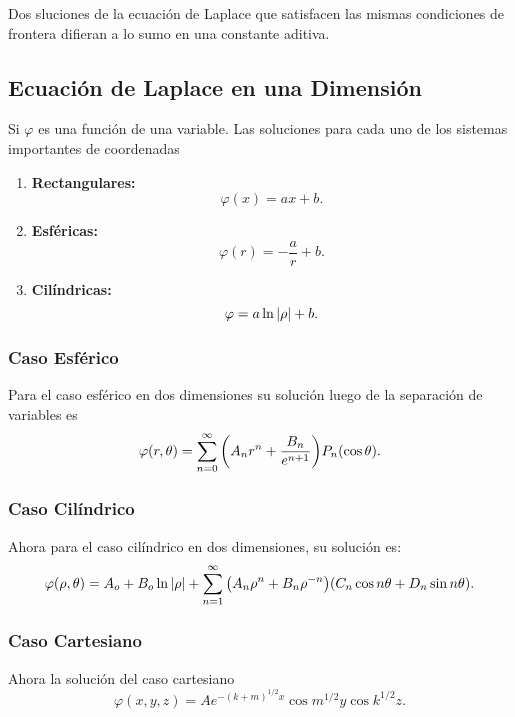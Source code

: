 \begin{teorema}
	Dos sluciones de la ecuación de Laplace que satisfacen las mismas condiciones de frontera difieran a lo sumo en una constante aditiva.
\end{teorema}


\subsection{Ecuación de Laplace en una Dimensión}
Si $\varphi$ es una función de una variable. Las soluciones para cada uno de los sistemas importantes de coordenadas

\begin{enumerate}
	\item \textbf{Rectangulares:}
	\begin{equation}
		\varphi (x) = ax + b.
	\end{equation}
	\item \textbf{Esféricas: }
	\begin{equation}
		\varphi (r) = -\frac{a}{r} + b.
	\end{equation}
	\item \textbf{Cilíndricas: }
	\begin{equation}
		\varphi = a\ln{\abs{\rho}} + b.
	\end{equation}
\end{enumerate}

\subsubsection{Caso Esférico}
Para el caso esférico en dos dimensiones su solución luego de la separación de variables es
\begin{equation}
	\varphi (r,\theta) = \sum _{n=0} ^\infty \qty(A_n r^n + \frac{B_n}{e^{n+1}}) P_n (\cos{\theta}).
\end{equation}

\subsubsection{Caso Cilíndrico}
Ahora para el caso cilíndrico en dos dimensiones, su solución es:
\begin{equation}
	\varphi (\rho ,\theta) = A_o + B_o \ln{\abs{\rho}} + \sum _{n=1} ^\infty \qty(A_n \rho ^n + B_n \rho ^{-n}) \qty(C_n \cos{n \theta} + D_n \sin{n\theta}).
\end{equation}

\subsubsection{Caso Cartesiano}
Ahora la solución del caso cartesiano
\begin{equation}
	\varphi (x,y,z) = A e^{-(k + m) ^{1/2} x} \cos{m^{1/2} y} \cos{k^{1/2} z}.
\end{equation}

